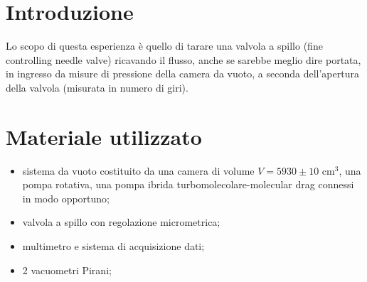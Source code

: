 \section{Introduzione}

Lo scopo di questa esperienza è quello di tarare una valvola a spillo (fine controlling needle valve) ricavando il flusso, anche se sarebbe meglio dire portata, in ingresso da misure di pressione della camera da vuoto, a seconda dell'apertura della valvola (misurata in numero di giri).

\section{Materiale utilizzato}

\begin{itemize}
	\item{sistema da vuoto costituito da una camera di volume $V = 5930 \pm 10$ \si{\centi\metre}$^3$, una pompa rotativa, una pompa ibrida turbomolecolare-molecular drag connessi in modo opportuno;}
	\item{valvola a spillo con regolazione micrometrica;}
	\item{multimetro e sistema di acquisizione dati;}
	\item{2 vacuometri Pirani;}
\end{itemize}
